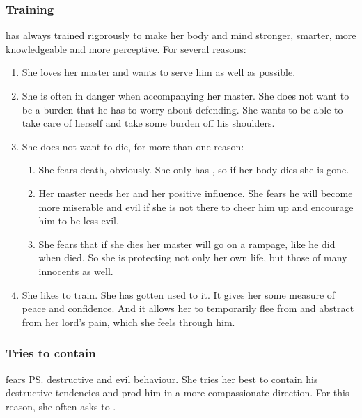 \subsubsection{Training}
\Criseis{} has always trained rigorously to make her body and mind stronger, smarter, more knowledgeable and more perceptive. 
For several reasons:
\begin{enumerate}
  \item She loves her master and wants to serve him as well as possible.
  \item She is often in danger when accompanying her master. 
    She does not want to be a burden that he has to worry about defending. 
    She wants to be able to take care of herself and take some burden off his shoulders. 
  \item She does not want to die, for more than one reason:
    \begin{enumerate}
      \item 
        She fears death, obviously. 
        She only has , so if her body dies she is gone. 
      \item 
        Her master needs her and her positive influence. 
        She fears he will become more miserable and evil if she is not there to cheer him up and encourage him to be less evil. 
      \item 
        She fears that if she dies her master will go on a rampage, like he did when  died.
        So she is protecting not only her own life, but those of many innocents as well. 
    \end{enumerate}
  \item 
    She likes to train. 
    She has gotten used to it. 
    It gives her some measure of peace and confidence. 
    And it allows her to temporarily flee from and abstract from her lord's pain, which she feels through him. 
\end{enumerate}





\subsubsection{Tries to contain \Ishnaruchaefir}
\Criseis{} fears \ps{\Ishnaruchaefir} destructive and evil behaviour. 
She tries her best to contain his destructive tendencies and prod him in a more compassionate direction. 
For this reason, she often asks to . 











